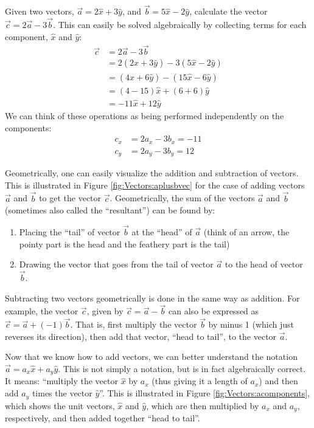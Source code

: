 \begin{example}{Given two vectors, $\vec a=2\hat x+3\hat y$, and $\vec b=5\hat x-2\hat y$, calculate the vector $\vec c= 2\vec a- 3\vec b$.}
This can easily be solved algebraically by collecting terms for each component, $\hat x$ and $\hat y$:
\begin{align*}
\vec c &= 2\vec a- 3\vec b\\
&=2 (2\hat x+3\hat y) - 3 (5\hat x-2\hat y) \\
&=(4\hat x+6\hat y)-(15\hat x-6\hat y) \\
&=(4-15)\hat x + (6+6) \hat y\\
&= -11 \hat x + 12 \hat y
\end{align*}
We can think of these operations as being performed independently on the components:
\begin{align*}
c_x&=2a_x-3b_x=-11\\
c_y&=2a_y-3b_y=12
\end{align*} 
\end{example}

Geometrically, one can easily visualize the addition and subtraction of vectors. This is illustrated in Figure \ref{fig:Vectors:aplusbvec} for the case of adding vectors $\vec a$ and $\vec b$ to get the vector $\vec c$. Geometrically, the sum of the vectors $\vec a$ and $\vec b$ (sometimes also called the ``resultant'') can be found by:
\begin{enumerate}
\item Placing the ``tail'' of vector $\vec b$ at the ``head'' of $\vec a$ (think of an arrow, the pointy part is the head and the feathery part is the tail)
\item Drawing the vector that goes from the tail of vector $\vec a$ to the head of vector $\vec b$.
\end{enumerate}


Subtracting two vectors geometrically is done in the same way as addition. For example, the vector $\vec c$, given by $\vec c=\vec a -\vec b$ can also be expressed as $\vec c = \vec a + (-1) \vec b$. That is, first multiply the vector $\vec b$ by minus 1 (which just reverses its direction), then add that vector, ``head to tail'', to the vector $\vec a$. 

Now that we know how to add vectors, we can better understand the notation $\vec a = a_x \hat x+ a_y\hat y$. This is not simply a notation, but is in fact algebraically correct. It means: ``multiply the vector $\hat x$ by $a_x$ (thus giving it a length of $a_x$) and then add $a_y$ times the vector $\hat y$''. This is illustrated in Figure \ref{fig:Vectors:acomponents}, which shows the unit vectors, $\hat x$ and $\hat y$, which are then multiplied by $a_x$ and $a_y$, respectively, and then added together ``head to tail''.

